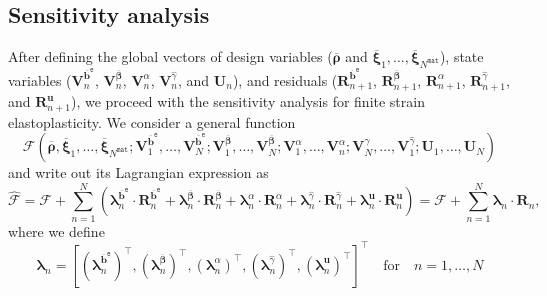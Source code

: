 \documentclass[preprint,11pt]{elsarticle}
\theoremstyle{definition}
\begin{document}
\subsection{Sensitivity analysis}
\label{Sec: Sensitivity Analysis}

After defining the global vectors of design variables ($\overline{\boldsymbol{\rho}}$ and $\overline{\boldsymbol{\xi}}_1, \ldots, \overline{\boldsymbol{\xi}}_{N^\texttt{mat}}$), state variables ($\mathbf{V}_n^{\overline{\mathbf{b}}^\texttt{e}}$, $\mathbf{V}_n^{\overline{\boldsymbol{\beta}}}$, $\mathbf{V}_n^\alpha$, $\mathbf{V}_n^{\widehat{\gamma}}$, and $\mathbf{U}_n$), and residuals ($\mathbf{R}_{n+1}^{\overline{\mathbf{b}}^\texttt{e}}$, $\mathbf{R}_{n+1}^{\overline{\boldsymbol{\beta}}}$, $\mathbf{R}_{n+1}^{\alpha}$, $\mathbf{R}_{n+1}^{\widehat{\gamma}}$, and $\mathbf{R}_{n+1}^\mathbf{u}$), we proceed with the sensitivity analysis for finite strain elastoplasticity. We consider a general function
\begin{equation*}
    \mathcal{F}(\overline{\boldsymbol{\rho}}, \overline{\boldsymbol{\xi}}_1, \ldots, \overline{\boldsymbol{\xi}}_{N^\texttt{mat}}; \mathbf{V}_1^{\overline{\mathbf{b}}^\texttt{e}}, \ldots, \mathbf{V}_N^{\overline{\mathbf{b}}^\texttt{e}}; \mathbf{V}_1^{\overline{\boldsymbol{\beta}}}, \ldots, \mathbf{V}_N^{\overline{\boldsymbol{\beta}}}; \mathbf{V}_1^\alpha, \ldots, \mathbf{V}_n^\alpha; \mathbf{V}_N^{\widehat{\gamma}}, \ldots, \mathbf{V}_1^{\widehat{\gamma}}; \mathbf{U}_1, \ldots, \mathbf{U}_N)
\end{equation*}
and write out its Lagrangian expression as
\begin{equation*}
    \widehat{\mathcal{F}} = \mathcal{F} + \sum_{n=1}^N \left( \boldsymbol{\lambda}_n^{\overline{\mathbf{b}}^\texttt{e}} \cdot \mathbf{R}_n^{\overline{\mathbf{b}}^\texttt{e}}
    + \boldsymbol{\lambda}_n^{\overline{\boldsymbol{\beta}}} \cdot \mathbf{R}_n^{\overline{\boldsymbol{\beta}}}
    + \boldsymbol{\lambda}_n^\alpha \cdot \mathbf{R}_n^\alpha
    + \boldsymbol{\lambda}_n^{\widehat{\gamma}} \cdot \mathbf{R}_n^{\widehat{\gamma}}
    + \boldsymbol{\lambda}_n^\mathbf{u} \cdot \mathbf{R}_n^\mathbf{u} \right)
    = \mathcal{F} + \sum_{n=1}^N \boldsymbol{\lambda}_n \cdot \mathbf{R}_n,
\end{equation*}
where we define
\begin{equation*}
    \boldsymbol{\lambda}_n = \left[
    \left( \boldsymbol{\lambda}_n^{\overline{\mathbf{b}}^\texttt{e}} \right)^\top,
    \left( \boldsymbol{\lambda}_n^{\overline{\boldsymbol{\beta}}} \right)^\top,
    \left( \boldsymbol{\lambda}_n^\alpha \right)^\top,
    \left( \boldsymbol{\lambda}_n^{\widehat{\gamma}} \right)^\top,
    \left( \boldsymbol{\lambda}_n^\mathbf{u} \right)^\top
    \right]^\top
    \quad \text{for} \quad
    n = 1,\ldots,N
\end{equation*}
\end{document}
